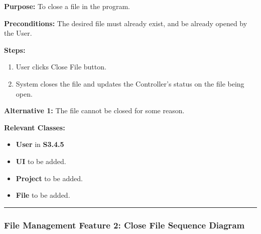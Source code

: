 \documentclass[twoside,letterpaper]{article}
\begin{document}
\noindent\textbf{Purpose:} To close a file in the program. \newline

\noindent\textbf{Preconditions:} The desired file must already exist, and be already opened by the User. \newline

\noindent\textbf{Steps:}
\begin{enumerate}
	\item User clicks Close File button.
	\item System closes the file and updates the Controller's status on the file being open.
\end{enumerate}

\noindent\textbf{Alternative 1:} The file cannot be closed for some reason. \newline

\noindent\textbf{Relevant Classes:}
\begin{itemize}
	\item \textbf{User} in \textbf{S3.4.5}
	\item \textbf{UI} to be added.
	\item \textbf{Project} to be added.
	\item \textbf{File} to be added.
\end{itemize}
\vspace{8pt}
\hrule

\newpage

\subsubsection[File Management Feature 2: Close File Sequence Diagram]{\rmfamily\bfseries\color{black}
	File Management Feature 2: Close File Sequence Diagram}
\hypertarget{RefHeading22059017292}{}
\end{document}
